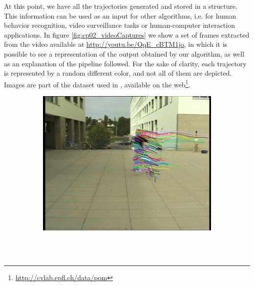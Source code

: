 At this point, we have all the trajectories generated and stored in a structure. This information can be used as 
an input for other algorithms, i.e. for human behavior recognition, video surveillance tasks or human-computer 
interaction applications. In figure \ref{fig:cp02_videoCaptures} we show a set of frames extracted from the video available at \url{http://youtu.be/QqE_cBTM1jo}, in which it is possible to see a representation of the output obtained by our 
algorithm, as well as an explanation of the pipeline followed. For the sake of clarity, each trajectory is represented by a random different color, and not all of them 
are depicted. Images are part of the dataset used in \cite{berclaz2011multiple}, available on the 
web\footnote{\url{http://cvlab.epfl.ch/data/pom}}.

\begin{figure}[t]
        \centering
        \begin{subfigure}[b]{0.24\textwidth}
                \centering
                \includegraphics[width=\textwidth, trim=6 0 5 1, clip]{fig5.jpg}
                \caption{~}
                \label{fig:cp02_videoCapture1}
        \end{subfigure}%
        ~ %
        \begin{subfigure}[b]{0.24\textwidth}
                \centering

\end{subfigure}
\end{figure}
